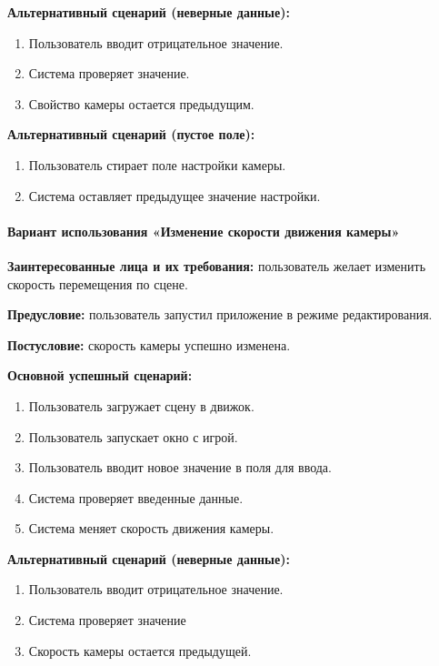 \textbf{Альтернативный сценарий (неверные данные):}
\begin{enumerate}
	\item Пользователь вводит отрицательное значение.
	
	\item Система проверяет значение.
	
	\item Свойство камеры остается предыдущим.
\end{enumerate}

\textbf{Альтернативный сценарий (пустое поле):}
\begin{enumerate}
	\item Пользователь стирает поле настройки камеры.
	
	\item Система оставляет предыдущее значение настройки.
\end{enumerate}

\paragraph{Вариант использования «Изменение скорости движения камеры»}
\textbf{Заинтересованные лица и их требования:} пользователь желает изменить скорость перемещения по сцене.

\textbf{Предусловие:} пользователь запустил приложение в режиме редактирования.

\textbf{Постусловие:} скорость камеры успешно изменена.

\textbf{Основной успешный сценарий:}

\begin{enumerate}
	\item Пользователь загружает сцену в движок.
	
	\item Пользователь запускает окно с игрой.
	
	\item Пользователь вводит новое значение в поля для ввода.
	
	\item Система проверяет введенные данные.
	
	\item Система меняет скорость движения камеры.
\end{enumerate}

\textbf{Альтернативный сценарий (неверные данные):}
\begin{enumerate}
	\item Пользователь вводит отрицательное значение.
	
	\item Система проверяет значение
	
	\item Скорость камеры остается предыдущей.
\end{enumerate}

